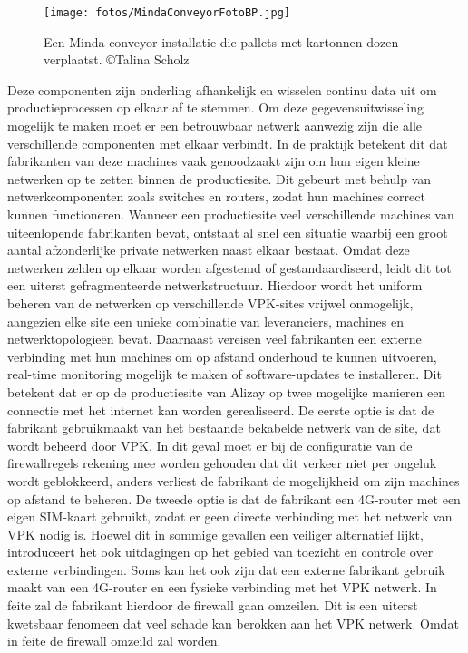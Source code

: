\begin{figure}[H]
    \centering
    \texttt{[image: fotos/MindaConveyorFotoBP.jpg]}
    \caption[TEMP Minda]{\label{fig:grail} Een Minda conveyor installatie die pallets met kartonnen dozen verplaatst. ©Talina Scholz}
\end{figure} 

Deze componenten zijn onderling afhankelijk en wisselen continu data uit om productieprocessen op elkaar af te stemmen. Om deze gegevensuitwisseling mogelijk te maken moet er een betrouwbaar netwerk aanwezig zijn die alle verschillende componenten met elkaar verbindt.
In de praktijk betekent dit dat fabrikanten van deze machines vaak genoodzaakt zijn om hun eigen kleine netwerken op te zetten binnen de productiesite. Dit gebeurt met behulp van netwerkcomponenten zoals switches en routers, zodat hun machines correct kunnen functioneren. Wanneer een productiesite veel verschillende machines van uiteenlopende fabrikanten bevat, ontstaat al snel een situatie waarbij een groot aantal afzonderlijke private netwerken naast elkaar bestaat. Omdat deze netwerken zelden op elkaar worden afgestemd of gestandaardiseerd, leidt dit tot een uiterst gefragmenteerde netwerkstructuur. Hierdoor wordt het uniform beheren van de netwerken op verschillende VPK-sites vrijwel onmogelijk, aangezien elke site een unieke combinatie van leveranciers, machines en netwerktopologieën bevat.
Daarnaast vereisen veel fabrikanten een externe verbinding met hun machines om op afstand onderhoud te kunnen uitvoeren, real-time monitoring mogelijk te maken of software-updates te installeren. Dit betekent dat er op de productiesite van Alizay op twee mogelijke manieren een connectie met het internet kan worden gerealiseerd. De eerste optie is dat de fabrikant gebruikmaakt van het bestaande bekabelde netwerk van de site, dat wordt beheerd door VPK. In dit geval moet er bij de configuratie van de firewallregels rekening mee worden gehouden dat dit verkeer niet per ongeluk wordt geblokkeerd, anders verliest de fabrikant de mogelijkheid om zijn machines op afstand te beheren.
De tweede optie is dat de fabrikant een 4G-router met een eigen SIM-kaart gebruikt, zodat er geen directe verbinding met het netwerk van VPK nodig is. Hoewel dit in sommige gevallen een veiliger alternatief lijkt, introduceert het ook uitdagingen op het gebied van toezicht en controle over externe verbindingen. Soms kan het ook zijn dat een externe fabrikant gebruik maakt van een 4G-router en een fysieke verbinding met het VPK netwerk. In feite zal de fabrikant hierdoor de firewall gaan omzeilen. Dit is een uiterst kwetsbaar fenomeen dat veel schade kan berokken aan het VPK netwerk. Omdat in feite de firewall omzeild zal worden.
